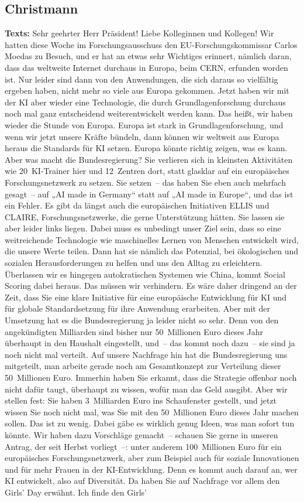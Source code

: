 \documentclass{article}
\begin{document}
\subsection{Christmann}
\noindent\textbf{Texts:} Sehr geehrter Herr Präsident! Liebe Kolleginnen und Kollegen! Wir hatten diese Woche im Forschungsausschuss den EU-Forschungskommissar Carlos Moedas zu Besuch, und er hat an etwas sehr Wichtiges erinnert, nämlich daran, dass das weltweite Internet durchaus in Europa, beim CERN, erfunden worden ist. Nur leider sind dann von den Anwendungen, die sich daraus so vielfältig ergeben haben, nicht mehr so viele aus Europa gekommen. Jetzt haben wir mit der KI aber wieder eine Technologie, die durch Grundlagenforschung durchaus noch mal ganz entscheidend weiterentwickelt werden kann. Das heißt, wir haben wieder die Stunde von Europa. Europa ist stark in Grundlagenforschung, und wenn wir jetzt unsere Kräfte bündeln, dann können wir weltweit aus Europa heraus die Standards für KI setzen.  Europa könnte richtig zeigen, was es kann. Aber was macht die Bundesregierung? Sie verlieren sich in kleinsten Aktivitäten wie 20 KI-Trainer hier und 12 Zentren dort, statt glasklar auf ein europäisches Forschungsnetzwerk zu setzen.  Sie setzen – das haben Sie eben auch mehrfach gesagt – auf „AI made in Germany“ statt auf „AI made in Europe“, und das ist ein Fehler.  Es gibt da längst auch die europäischen Initiativen ­ELLIS und CLAIRE, Forschungsnetzwerke, die gerne Unterstützung hätten. Sie lassen sie aber leider links liegen. Dabei muss es unbedingt unser Ziel sein, dass so eine weitreichende Technologie wie maschinelles Lernen von Menschen entwickelt wird, die unsere Werte teilen. Dann hat sie nämlich das Potenzial, bei ökologischen und sozialen Herausforderungen zu helfen und uns den Alltag zu erleichtern. Überlassen wir es hingegen autokratischen Systemen wie China, kommt Social Scoring dabei heraus. Das müssen wir verhindern.  Es wäre daher dringend an der Zeit, dass Sie eine klare Initiative für eine europäische Entwicklung für KI und für globale Standardsetzung für ihre Anwendung erarbeiten. Aber mit der Umsetzung hat es die Bundesregierung ja leider nicht so sehr. Denn von den angekündigten Milliarden sind bisher nur 50 Millionen Euro dieses Jahr überhaupt in den Haushalt eingestellt, und – das kommt noch dazu – sie sind ja noch nicht mal verteilt. Auf unsere Nachfrage hin hat die Bundesregierung uns mitgeteilt, man arbeite gerade noch am Gesamtkonzept zur Verteilung dieser 50 Millionen Euro. Immerhin haben Sie erkannt, dass die Strategie offenbar noch nicht dafür taugt, überhaupt zu wissen, wofür man das Geld ausgibt. Aber wir stellen fest: Sie haben 3 Milliarden Euro ins Schaufenster gestellt, und jetzt wissen Sie noch nicht mal, was Sie mit den 50 Millionen Euro dieses Jahr machen sollen. Das ist zu wenig.  Dabei gäbe es wirklich genug Ideen, was man sofort tun könnte. Wir haben dazu Vorschläge gemacht – schauen Sie gerne in unseren Antrag, der seit Herbst vorliegt –: unter anderem 100 Millionen Euro für ein europäisches Forschungsnetzwerk, aber zum Beispiel auch für soziale Innovationen und für mehr Frauen in der KI-Entwicklung. Denn es kommt auch darauf an, wer KI entwickelt, also auf Diversität. Da haben Sie auf Nachfrage vor allem den Girls’ Day erwähnt. Ich finde den Girls’ 
\end{document}

